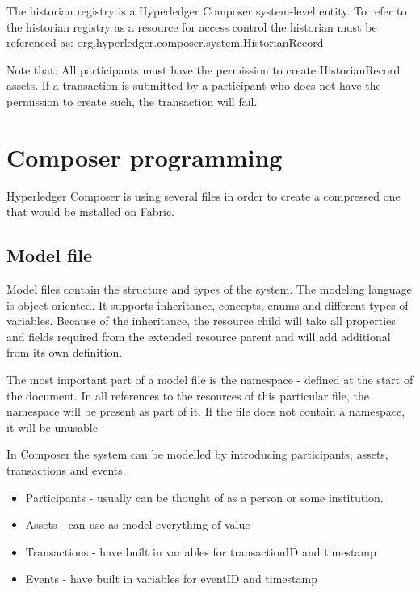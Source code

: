 \documentclass[a4paper,11pt]{report}
\begin{document}
The historian registry is a Hyperledger Composer system-level entity. To refer to the historian registry as a resource for access control the historian must be referenced as: org.hyperledger.composer.system.HistorianRecord

Note that: All participants must have the permission to create HistorianRecord assets. If a transaction is submitted by a participant who does not have the permission to create such, the transaction will fail.

\section{Composer programming}
\label{composerProgramming}

Hyperledger Composer is using several files in order to create a compressed one that would be installed on Fabric.

\subsection{Model file}
Model files contain the structure and types of the system. The modeling language is object-oriented. It supports inheritance, concepts, enums and different types of variables. Because of the inheritance, the resource child will take all properties and fields required from the extended resource parent and will add additional from its own definition. 

The most important part of a model file is the namespace - defined at the start of the document. In all references to the resources of this particular file, the namespace will be present as part of it. If the file does not contain a namespace, it will be unusable 

In Composer the system can be modelled by introducing participants, assets, transactions and events. 
\begin{itemize}

\item Participants - usually can be thought of as a person or some institution.
\item Assets - can use as model everything of value
\item Transactions - have built in variables for transactionID and timestamp 
\item Events - have built in variables for eventID and timestamp

\end{itemize}
\end{document}
